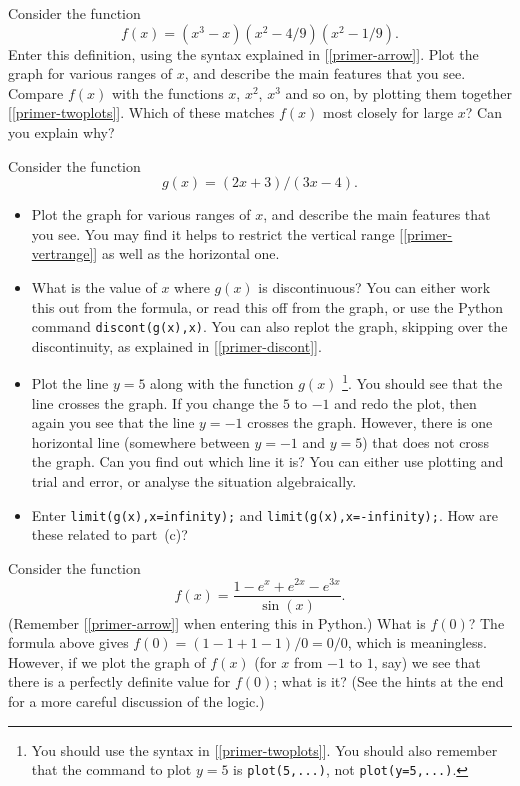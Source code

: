 \documentclass[a4paper,10pt]{amsbook}
\begin{document}
\begin{exercise}\label{ex-wiggle}
 Consider the function 
 \[ f(x) = (x^3-x)(x^2-4/9)(x^2-1/9). \] Enter this
 definition, using the syntax explained in
 [\ref{primer-arrow}].  Plot the graph for various ranges of
 $x$, and describe the main features that you see.  Compare
 $f(x)$ with the functions $x$, $x^2$, $x^3$ and so on, by
 plotting them together [\ref{primer-twoplots}].  Which of
 these matches $f(x)$ most closely for large $x$?  Can you
 explain why?  
\end{exercise}

\begin{exercise}\label{ex-mobius}
 Consider the function
 \[ g(x) = (2x+3)/(3x-4). \]
 \begin{itemize}
  \item[(a)]
   Plot the graph for various ranges of $x$, and describe the main
   features that you see.  You may find it helps to restrict the
   vertical range [\ref{primer-vertrange}] as well as the horizontal one.
  \item[(b)] What is the value of $x$ where $g(x)$ is discontinuous? 
   You can either work this out from the formula, or read this off
   from the graph, or use the Python command \verb~discont(g(x),x)~. 
   You can also replot the graph, skipping over the
   discontinuity, as explained in [\ref{primer-discont}].
  \item[(c)] 
   Plot the line $y=5$ along with the function $g(x)$  
   \footnote{You should use the syntax in [\ref{primer-twoplots}].  You
   should also remember that the command to plot $y=5$ is
   \verb~plot(5,...)~, not \verb~plot(y=5,...)~.}. 
   You should see that the line crosses the graph.  If you change the
   $5$ to $-1$ and redo the plot, then again you see that the line
   $y=-1$ crosses the graph.  However, there is one horizontal line
   (somewhere between $y=-1$ and $y=5$) that does not cross the
   graph.  Can you find out which line it is?  You can either use
   plotting and trial and error, or analyse the situation
   algebraically. 
  \item[(d)] Enter \verb~limit(g(x),x=infinity);~ and
   \verb~limit(g(x),x=-infinity);~.  How are these related to
   part~(c)? 
 \end{itemize}
\end{exercise}
        
\begin{exercise}\label{ex-lhopital}
 Consider the function
 \[ f(x) = \frac{1 - e^x + e^{2x} - e^{3x}}{\sin(x)}. \]
 (Remember [\ref{primer-arrow}] when entering this in Python.)
 What is $f(0)$?  The formula above gives $f(0)=(1-1+1-1)/0=0/0$,
 which is meaningless.  However, if we plot the graph of $f(x)$ (for
 $x$ from $-1$ to $1$, say) we see that there is a perfectly definite
 value for $f(0)$; what is it?  
(See the hints at the end for a more careful discussion of the logic.) 
\end{exercise}
\end{document}
